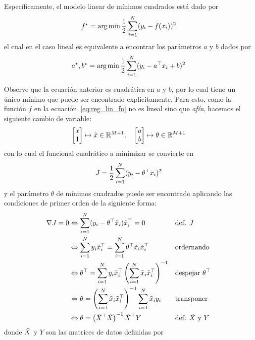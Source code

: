Específicamente, el modelo linear de mínimos cuadrados está dado por 
\begin{equation}
	f^\star = \operatorname*{arg\,min} \frac{1}{2}\sum_{i=1}^N(y_i-f(x_i))^2
	\label{eq:least_squares}
\end{equation}
el cual en el caso lineal es equivalente a encontrar los parámetros $a$ y $b$ dados por
\begin{equation}
	a^\star,b^\star = \operatorname*{arg\,min} \frac{1}{2}\sum_{i=1}^N(y_i-a^
	\top x_i + b)^2
	\label{eq:lin_least_squares}
\end{equation}

Observe que la ecuación anterior es cuadrática en $a$ y $b$, por lo cual tiene un único mínimo que puede ser encontrado explícitamente. Para esto, como la función $f$ en la ecuación~\eqref{eq:reg_lin_fn} no es lineal sino que \emph{afín}, hacemos el siguiente cambio de variable:
\begin{equation}
  \left[ \begin{matrix}x \\  1\end{matrix}\right] \mapsto \tilde{x}\in{\mathbb R}^{M+1},\quad
  \left[ \begin{matrix}a \\  b\end{matrix}\right]\mapsto \theta\in{\mathbb R}^{M+1}
 \label{eq:truco_reg_lin} 
\end{equation}
con lo cual el funcional cuadrático a minimizar se convierte en
\begin{equation}
	J = \frac{1}{2}\sum_{i=1}^N(y_i-\theta^
	\top \tilde{x}_i)^2
	\label{eq:lin_least_squares2}
\end{equation} 
y el parámetro $\theta$ de mínimos cuadrados puede ser encontrado aplicando las condiciones de primer orden de la siguiente forma:
\begin{align}
\nabla J=0 &\Leftrightarrow \sum_{i=1}^N(y_i-\theta^\top \tilde{x}_i)\tilde{x}_i^\top=0  							&&\text{def. $J$}\nonumber\\  
&\Leftrightarrow \sum_{i=1}^Ny_i\tilde{x}_i^\top = \sum_{i=1}^N\theta^\top \tilde{x}_i\tilde{x}_i^\top					&&\text{ordernando}\nonumber\\
&\Leftrightarrow \theta^\top = \sum_{i=1}^Ny_i\tilde{x}_i^\top \left(\sum_{i=1}^N \tilde{x}_i\tilde{x}_i^\top\right)^{-1}	&&\text{despejar $\theta^\top$}\nonumber\\
&\Leftrightarrow \theta =  \left(\sum_{i=1}^N \tilde{x}_i\tilde{x}_i^\top\right)^{-1} \sum_{i=1}^N \tilde{x}_i y_i 		&&\text{transponer}\nonumber\\
&\Leftrightarrow \theta = \left(\tilde{X}^\top\tilde{X} \right)^{-1} \tilde{X}^\top Y 											&&\text{def. $\tilde{X}$ y $Y$} \label{eq:sol_mse}
\end{align}
donde $\tilde{X}$ y $Y$ son las matrices de datos definidas por




